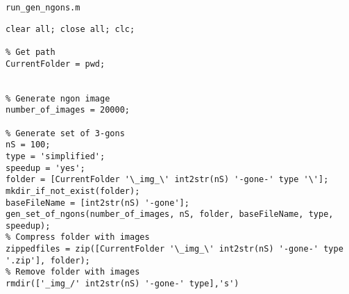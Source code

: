 \documentclass[12pt,a4paper]{article}
\begin{document}
\noindent
\verb|run_gen_ngons.m|
\begin{lstlisting}
clear all; close all; clc;

% Get path
CurrentFolder = pwd;


% Generate ngon image
number_of_images = 20000;

% Generate set of 3-gons
nS = 100;
type = 'simplified';
speedup = 'yes';
folder = [CurrentFolder '\_img_\' int2str(nS) '-gone-' type '\'];
mkdir_if_not_exist(folder);
baseFileName = [int2str(nS) '-gone'];
gen_set_of_ngons(number_of_images, nS, folder, baseFileName, type, speedup);
% Compress folder with images
zippedfiles = zip([CurrentFolder '\_img_\' int2str(nS) '-gone-' type '.zip'], folder);
% Remove folder with images
rmdir(['_img_/' int2str(nS) '-gone-' type],'s')
\end{lstlisting}
\end{document}

